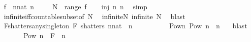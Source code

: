 \begin{isabellebody}
\ {\isacharquery}{\kern0pt}f\ {\isacharequal}{\kern0pt}\ {\isachardoublequoteopen}{\isasymlambda}n{\isacharcolon}{\kern0pt}{\isacharcolon}{\kern0pt}nat{\isachardot}{\kern0pt}\ {\isacharbraceleft}{\kern0pt}n{\isacharbraceright}{\kern0pt}{\isachardoublequoteclose}\ \isanewline
\ \ \isamarkupfalse%
\ {\isacharquery}{\kern0pt}N\ {\isacharequal}{\kern0pt}\ {\isachardoublequoteopen}range\ {\isacharquery}{\kern0pt}f{\isachardoublequoteclose}\isanewline
\ \ \isamarkupfalse%
\ {\isachardoublequoteopen}inj\ {\isacharparenleft}{\kern0pt}{\isasymlambda}n{\isachardot}{\kern0pt}\ {\isacharbraceleft}{\kern0pt}n{\isacharbraceright}{\kern0pt}{\isacharparenright}{\kern0pt}{\isachardoublequoteclose}\ \isamarkupfalse%
\ simp\isanewline
\ \ \isamarkupfalse%
\ infinite{\isacharunderscore}{\kern0pt}iff{\isacharunderscore}{\kern0pt}countable{\isacharunderscore}{\kern0pt}subset{\isacharbrackleft}{\kern0pt}of\ {\isacharquery}{\kern0pt}N{\isacharbrackright}{\kern0pt}\ \isamarkupfalse%
\ infinite{\isacharunderscore}{\kern0pt}N{\isacharcolon}{\kern0pt}\ {\isachardoublequoteopen}infinite\ {\isacharquery}{\kern0pt}N{\isachardoublequoteclose}\ \isamarkupfalse%
\ blast\isanewline
\ \ \isamarkupfalse%
\ F{\isacharunderscore}{\kern0pt}shatters{\isacharunderscore}{\kern0pt}any{\isacharunderscore}{\kern0pt}singleton{\isacharcolon}{\kern0pt}\ {\isachardoublequoteopen}{\isacharquery}{\kern0pt}F\ shatters\ {\isacharbraceleft}{\kern0pt}n{\isacharcolon}{\kern0pt}{\isacharcolon}{\kern0pt}nat{\isacharbraceright}{\kern0pt}{\isachardoublequoteclose}\ \ n\isanewline
\ \ \isamarkupfalse%
\ {\isacharminus}{\kern0pt}\isanewline
\ \ \ \ \isamarkupfalse%
\ Pow{\isacharunderscore}{\kern0pt}n{\isacharcolon}{\kern0pt}\ {\isachardoublequoteopen}Pow\ {\isacharbraceleft}{\kern0pt}n{\isacharbraceright}{\kern0pt}\ {\isacharequal}{\kern0pt}\ {\isacharbraceleft}{\kern0pt}{\isacharbraceleft}{\kern0pt}n{\isacharbraceright}{\kern0pt}{\isacharcomma}{\kern0pt}\ {\isacharbraceleft}{\kern0pt}{\isacharbraceright}{\kern0pt}{\isacharbraceright}{\kern0pt}{\isachardoublequoteclose}\ \isamarkupfalse%
\ blast\isanewline
\ \ \ \ \isamarkupfalse%
\ {}{\isacharcolon}{\kern0pt}\ {\isachardoublequoteopen}Pow\ {\isacharbraceleft}{\kern0pt}n{\isacharbraceright}{\kern0pt}\ {\isasymsubseteq}\ {\isacharquery}{\kern0pt}F\ {\isasyminter}{\isacharasterisk}{\kern0pt}\ {\isacharbraceleft}{\kern0pt}n{\isacharbraceright}{\kern0pt}{\isachardoublequoteclose}\ \isanewline

\end{isabellebody}
